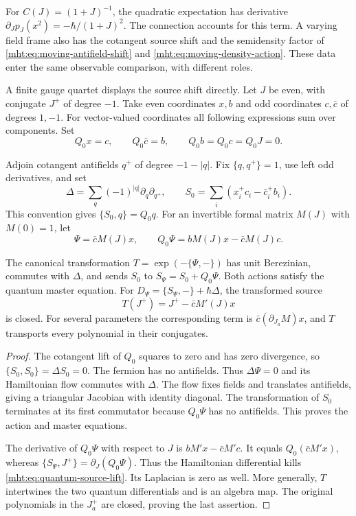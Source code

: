 For $C(J)=(1+J)^{-1}$, the quadratic expectation has derivative
$\partial_Jp_J(x^2)=-\hbar/(1+J)^2$.
The connection accounts for this term. A varying field frame also
has the cotangent source shift and the semidensity factor of
\eqref{mht:eq:moving-antifield-shift} and
\eqref{mht:eq:moving-density-action}. These data enter the same
observable comparison, with different roles.

A finite gauge quartet displays the source shift directly.
Let $J$ be even, with conjugate $J^+$ of degree $-1$. Take even
coordinates $x,b$ and odd coordinates $c,\bar c$ of degrees $1,-1$.
For vector-valued coordinates all following expressions sum over
components. Set
\[
 Q_0x=c,\qquad Q_0\bar c=b,\qquad Q_0b=Q_0c=Q_0J=0.
\]

Adjoin cotangent antifields $q^+$ of degree $-1-|q|$. Fix
$\{q,q^+\}=1$, use left odd derivatives, and set
\[
 \Delta=\sum_q(-1)^{|q|}\partial_q\partial_{q^+},\qquad
 S_0=\sum_i(x_i^+c_i-\bar c_i^+b_i).
\]
This convention gives $\{S_0,q\}=Q_0q$. For an invertible formal
matrix $M(J)$ with $M(0)=1$, let
\[
 \Psi=\bar cM(J)x,\qquad
 Q_0\Psi=bM(J)x-\bar cM(J)c.
\]

\begin{proposition}\label{mht:prop:quantum-source-lift}
The canonical transformation $T=\exp(-\{\Psi,-\})$ has unit
Berezinian, commutes with $\Delta$, and sends $S_0$ to
$S_\Psi=S_0+Q_0\Psi$. Both actions satisfy the quantum master
equation. For $D_\Psi=\{S_\Psi,-\}+\hbar\Delta$, the transformed
source
\begin{equation}\label{mht:eq:quantum-source-lift}
 T(J^+)=J^+-\bar c M'(J)x
\end{equation}
is closed. For several parameters the corresponding term is
$\bar c(\partial_{J_a}M)x$, and $T$ transports every polynomial
in their conjugates.
\end{proposition}

\begin{proof}
The cotangent lift of $Q_0$ squares to zero and has zero divergence,
so $\{S_0,S_0\}=\Delta S_0=0$. The fermion has no antifields.
Thus $\Delta\Psi=0$ and its Hamiltonian flow commutes with $\Delta$.
The flow fixes fields and translates antifields, giving a triangular
Jacobian with identity diagonal. The transformation of $S_0$
terminates at its first commutator because $Q_0\Psi$ has no
antifields. This proves the action and master equations.

The derivative of $Q_0\Psi$ with respect to $J$ is
$bM'x-\bar cM'c$. It equals $Q_0(\bar cM'x)$, whereas
$\{S_\Psi,J^+\}=\partial_J(Q_0\Psi)$. Thus the Hamiltonian
differential kills \eqref{mht:eq:quantum-source-lift}. Its Laplacian
is zero as well. More generally, $T$ intertwines the two quantum
differentials and is an algebra map. The original polynomials in
the $J_a^+$ are closed, proving the last assertion.
\end{proof}

